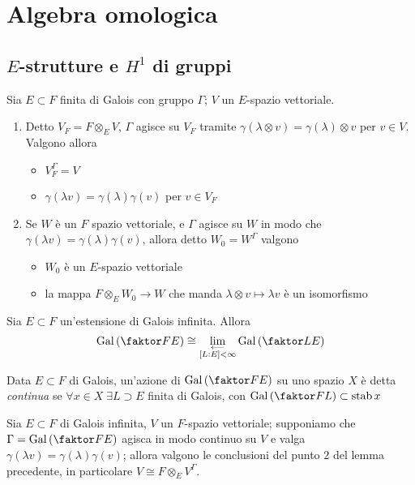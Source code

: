 \chapter{Algebra omologica}

\section{$E$-strutture e $H^1$ di gruppi}

\begin{lemma}
    Sia $E\subset F$ finita di Galois con gruppo $\Gamma$; $V$ un $E$-spazio vettoriale.
    \begin{enumerate}
        \item Detto $V_F=F\otimes_E V$, $\Gamma$ agisce su $V_F$ tramite $\gamma(\lambda\otimes v)=\gamma(\lambda)\otimes v$ per $v\in V$. Valgono allora
        \begin{itemize}
            \item $V_F^\Gamma = V$
            \item $\gamma(\lambda v)=\gamma(\lambda)\gamma(v)$ per $v\in V_F$
        \end{itemize}
        \item Se $W$ è un $F$ spazio vettoriale, e $\Gamma$ agisce su $W$ in modo che $\gamma(\lambda v)=\gamma(\lambda)\gamma(v)$, allora detto $W_0=W^\Gamma$ valgono
        \begin{itemize}
            \item $W_0$ è un $E$-spazio vettoriale
            \item la mappa $F\otimes_E W_0\to W$ che manda $\lambda\otimes v\mapsto \lambda v$ è un isomorfismo
        \end{itemize}
    \end{enumerate}
\end{lemma}


\begin{theorem}
    Sia $E\subset F$ un'estensione di Galois infinita. Allora $$\Gal{F}{E}\cong \lim_{\substack{\longleftarrow\\ [L:E]<\infty}}\Gal{L}{E}$$
\end{theorem}
\begin{definition}
    Data $E\subset F$ di Galois, un'azione di $\Gal{F}{E}$ su uno spazio $X$ è detta \emph{continua} se $\forall x\in X\;\exists L\supset E$ finita di Galois, con $\Gal{F}{L}\subset\stab x$
\end{definition}

\begin{lemma}
    Sia $E\subset F$ di Galois infinita, $V$ un $F$-spazio vettoriale; supponiamo che $\Gamma=\Gal{F}{E}$ agisca in modo continuo su $V$ e valga $\gamma(\lambda v)=\gamma(\lambda)\gamma(v)$; allora valgono le conclusioni del punto $2$ del lemma precedente, in particolare $V\cong F\otimes_E V^\Gamma$.
\end{lemma}

